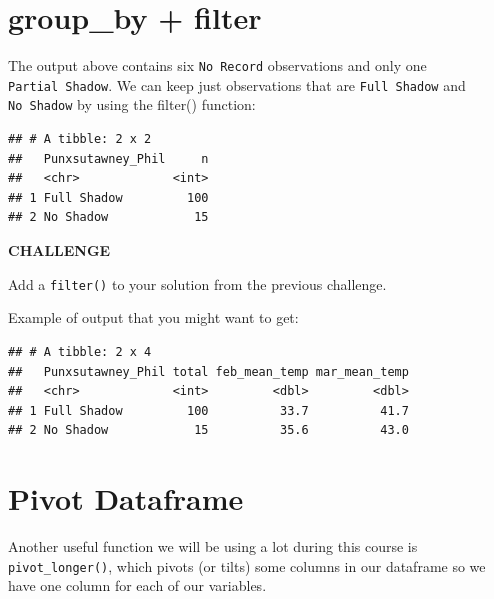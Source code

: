 \documentclass[
]{book}
\newenvironment{Shaded}{\begin{snugshade}}{\end{snugshade}}
\newcommand{\KeywordTok}[1]{\textcolor[rgb]{0.13,0.29,0.53}{\textbf{#1}}}
\newcommand{\NormalTok}[1]{#1}
\newcommand{\OperatorTok}[1]{\textcolor[rgb]{0.81,0.36,0.00}{\textbf{#1}}}
\newcommand{\StringTok}[1]{\textcolor[rgb]{0.31,0.60,0.02}{#1}}
\begin{document}
\hypertarget{group_by-filter}{%
\section{group\_by + filter}\label{group_by-filter}}

The output above contains six \texttt{No\ Record} observations and only one \texttt{Partial\ Shadow}. We can keep just observations that are \texttt{Full\ Shadow} and \texttt{No\ Shadow} by using the filter() function:

\begin{Shaded}
\end{Shaded}

\begin{verbatim}
## # A tibble: 2 x 2
##   Punxsutawney_Phil     n
##   <chr>             <int>
## 1 Full Shadow         100
## 2 No Shadow            15
\end{verbatim}

\textbf{CHALLENGE}

Add a \texttt{filter()} to your solution from the previous challenge.

Example of output that you might want to get:

\begin{verbatim}
## # A tibble: 2 x 4
##   Punxsutawney_Phil total feb_mean_temp mar_mean_temp
##   <chr>             <int>         <dbl>         <dbl>
## 1 Full Shadow         100          33.7          41.7
## 2 No Shadow            15          35.6          43.0
\end{verbatim}

\hypertarget{pivot-dataframe}{%
\section{Pivot Dataframe}\label{pivot-dataframe}}

Another useful function we will be using a lot during this course is \texttt{pivot\_longer()}, which pivots (or tilts) some columns in our dataframe so we have one column for each of our variables.
\end{document}
